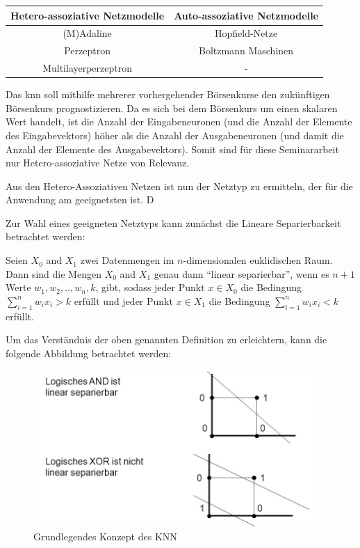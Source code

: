 \begin{center}
\begin{tabular}{|c|c|}
\hline 
\textbf{Hetero-assoziative Netzmodelle} & \textbf{Auto-assoziative Netzmodelle} \\ 
\hline 
(M)Adaline & Hopfield-Netze \\ 
\hline  
Perzeptron &  Boltzmann Maschinen \\ 
\hline 
Multilayerperzeptron & - \\ 
\hline 
\end{tabular} 
\end{center}

Das \acs{knn} soll mithilfe mehrerer vorhergehender Börsenkurse den zukünftigen Börsenkurs prognostizieren. Da es sich bei dem Börsenkurs um einen skalaren Wert handelt, ist die Anzahl der Eingabeneuronen (und die Anzahl der Elemente des Eingabevektors) höher als die Anzahl der Ausgabeneuronen (und damit die Anzahl der Elemente des Ausgabevektors). Somit sind für diese Seminararbeit nur Hetero-assoziative Netze von Relevanz.

Aus den Hetero-Assoziativen Netzen ist nun der Netztyp zu ermitteln, der für die Anwendung am geeignetsten ist. D

Zur Wahl eines geeigneten Netztyps kann zunächst die Lineare Separierbarkeit betrachtet werden:

\begin{defi}
Seien $X_{0}$ and $X_{1}$ zwei Datenmengen im $n$-dimensionalen euklidischen Raum. Dann sind die Mengen $X_{0}$ and $X_{1}$ genau dann  "`linear separierbar"', wenn es  $n+1$ Werte $w_{1}, w_{2},..,w_{n}, k$, gibt, sodass jeder Punkt  $x \in X_{0}$ die Bedingung $\sum^{n}_{i=1} w_{i}x_{i} > k$ erfüllt und jeder Punkt $x \in X_{1}$ die Bedingung $\sum^{n}_{i=1} w_{i}x_{i} < k$ erfüllt.
\end{defi}

Um das Verständnis der oben genannten Definition zu erleichtern, kann die folgende Abbildung betrachtet werden:

\begin{figure}[H]
\centering
		\includegraphics[width=0.95\textwidth]{Linear_Sep.PNG}
	\caption{Grundlegendes Konzept des KNN}
	\label{fig:Grundlegendes Konzept des KNN}
\end{figure}


